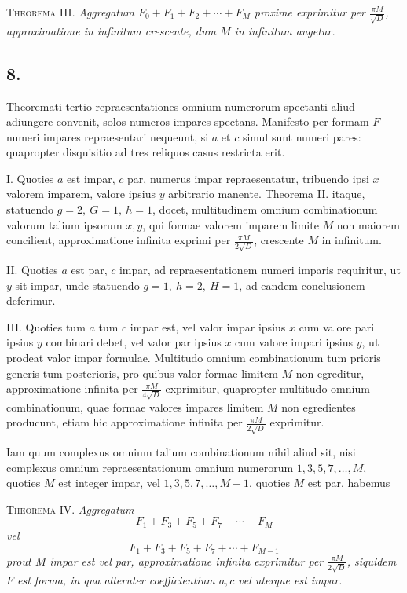 \documentclass[12pt]{article}
\begin{document}
\textsc{Theorema III.} \emph{Aggregatum $F_0+F_1+F_2+\cdots+F_M$ proxime exprimitur per $\frac{\pi M}{\sqrt D}$, approximatione in infinitum crescente, dum $M$ in infinitum augetur.}

\subsection*{8.}

Theoremati tertio repraesentationes omnium numerorum spectanti aliud adiungere convenit, solos numeros impares spectans. Manifesto per formam $F$ numeri impares repraesentari nequeunt, si $a$ et $c$ simul sunt numeri pares: quapropter disquisitio ad tres reliquos casus restricta erit.

I. Quoties $a$ est impar, $c$ par, numerus impar repraesentatur, tribuendo ipsi $x$ valorem imparem, valore ipsius $y$ arbitrario manente. Theorema II. itaque, statuendo $g=2,\ G=1,\ h=1$, docet, multitudinem omnium combinationum valorum talium ipsorum $x,y$, qui formae valorem imparem limite $M$ non maiorem concilient, approximatione infinita exprimi per $\frac{\pi M}{2\sqrt D}$, crescente $M$ in infinitum.

II. Quoties $a$ est par, $c$ impar, ad repraesentationem numeri imparis requiritur, ut $y$ sit impar, unde statuendo $g=1,\ h=2,\ H=1$, ad eandem conclusionem deferimur.

III. Quoties tum $a$ tum $c$ impar est, vel valor impar ipsius $x$ cum valore pari ipsius $y$ combinari debet, vel valor par ipsius $x$ cum valore impari ipsius $y$, ut prodeat valor impar formulae. Multitudo omnium combinationum tum prioris generis tum posterioris, pro quibus valor formae limitem $M$ non egreditur, approximatione infinita per $\frac{\pi M}{4\sqrt D}$ exprimitur, quapropter multitudo omnium combinationum, quae formae valores impares limitem $M$ non egredientes producunt, etiam hic approximatione infinita per $\frac{\pi M}{2\sqrt D}$ exprimitur.

Iam quum complexus omnium talium combinationum nihil aliud sit, nisi complexus omnium repraesentationum omnium numerorum $1,3,5,7,\ldots,M$, quoties $M$ est integer impar, vel $1,3,5,7,\ldots,M-1$, quoties $M$ est par, habemus

\textsc{Theorema IV.} \emph{Aggregatum}
\[
F_1+F_3+F_5+F_7+\cdots+F_M
\]
\emph{vel}
\[
F_1+F_3+F_5+F_7+\cdots+F_{M-1}
\]
\emph{prout $M$ impar est vel par, approximatione infinita exprimitur per $\frac{\pi M}{2\sqrt D}$, siquidem $F$ est forma, in qua alteruter coefficientium $a,c$ vel uterque est impar.}
\end{document}
